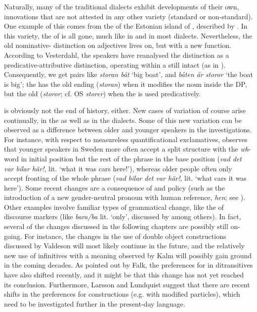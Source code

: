 \documentclass[output=paper]{langscibook}
\begin{document}
Naturally, many of the traditional dialects exhibit developments of their own, innovations that are not attested in any other variety (standard or non-standard). One example of this comes from the   of the Estonian island of , described by \citet{Vesterdahl2018}. In this variety, the  of  is all gone, much like in  and in most dialects. Nevertheless, the old nominative- distinction on adjectives lives on, but with a new function. According to Vesterdahl, the  speakers have reanalysed the distinction as a predicative-attributive distinction, operating within a still intact  (as in ). Consequently, we get pairs like \textit{storan båt} ‘big boat’, and \textit{båten är storor} ‘the boat is big’; the  has the old   ending (\textit{storan}) when it modifies the noun inside the DP, but the old   (\textit{storor}; cf. OS \textit{storer}) when the  is used predicatively.



 is obviously not the end of history, either. New cases of variation of course arise continually, in the  as well as in the dialects. Some of this new variation can be observed as a difference between older and younger speakers in the  investigations. For instance, with respect to measureless quantificational exclamatives, \citet{Vangsnes2014} observes that younger speakers in Sweden more often accept a split structure with the \textit{wh}{}-word in initial position but the rest of the phrase in the base position (\textit{vad det var bilar här!}, lit. ‘what it was cars here!’), whereas older people often only accept fronting of the whole phrase (\textit{vad bilar det var här!}, lit. ‘what cars it was here’). Some recent changes are a consequence of  and policy (such as the introduction of a new gender-neutral pronoun with human reference, \textit{hen}; see \citealt{LedinLyngfelt2013}). Other examples involve familiar types of grammatical change, like the  of discourse markers (like \textit{bara/ba} lit. ‘only’, discussed by \citealt{Eriksson1995} among others). In fact, several of the changes discussed in the following chapters are possibly still on-going. For instance, the changes in the use of double object constructions discussed by Valdeson will most likely continue in the future, and the relatively new use of  infinitives with a  meaning observed by Kalm will possibly gain ground in the coming decades. As pointed out by Falk, the preferences for  in ditransitives have also shifted recently, and it might be that this change has not yet reached its conclusion. Furthermore, Larsson and Lundquist suggest that there are recent shifts in the preferences for  constructions (e.g. with modified particles), which need to be investigated further in the present-day language.
\end{document}
